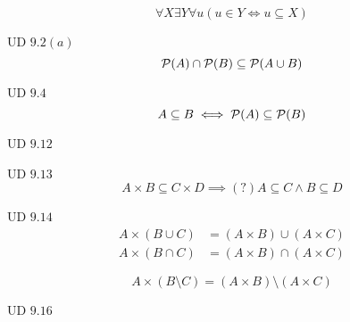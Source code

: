 \begin{frame}{}
  \begin{definition}
    \[
      \forall X \exists Y \forall u (u \in Y \iff u \subseteq X)
    \]
  \end{definition}
\end{frame}

\begin{frame}{}
  \begin{exampleblock}{UD $9.2 (a)$}
    \[
      \mathcal{P}(A) \cap \mathcal{P}(B) \subseteq \mathcal{P}(A \cup B)
    \]
  \end{exampleblock}
\end{frame}

\begin{frame}{}
  \begin{exampleblock}{UD $9.4$}
    \[
      A \subseteq B \iff \mathcal{P}(A) \subseteq \mathcal{P}(B)
    \]
  \end{exampleblock}
\end{frame}

\begin{frame}{}
  \begin{exampleblock}{UD $9.12$}
  \end{exampleblock}
\end{frame}

\begin{frame}{}
  \begin{exampleblock}{UD $9.13$}
    \[
      A \times B \subseteq C \times D \implies (?) A \subseteq C \land B \subseteq D
    \]
  \end{exampleblock}
\end{frame}

\begin{frame}{}
  \begin{exampleblock}{UD $9.14$}
    \begin{align*}
      A \times (B \cup C) &= (A \times B) \cup (A \times C)\\
      A \times (B \cap C) &= (A \times B) \cap (A \times C)
    \end{align*}
  \end{exampleblock}

  \pause
  \[
    A \times (B \setminus C) = (A \times B) \setminus (A \times C)
  \]
\end{frame}

\begin{frame}{}
  \begin{exampleblock}{UD $9.16$}
  \end{exampleblock}
\end{frame}
